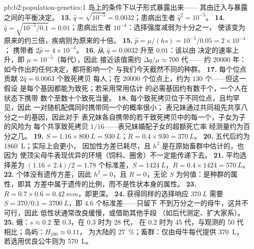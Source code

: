 \begin{solution}{pb:b2:population-genetics:1}
岛上的条件下以子形式暴露出来——
其由迁入与暴露之间的平衡决定。
\textbf{13.} $\hat q = \sqrt{10^{-5}} = 0.0032$；患病出生者 $\hat
q^{2} = 10^{-5}$。
\textbf{14.} $\hat q = \sqrt{10^{-5}/0.1} = 0.01$；患病出生者
$10^{-4}$：选择强度减弱为十分之一，
使该变为原来的约三倍，疾病则为原来的十倍。
\textbf{15.} $\hat p = \mu/(hs) = 10^{-5}/0.05 = 2\times 10^{-4}$；
携带者 $2\hat p = 4\times 10^{-4}$。
\textbf{16.} 从 $\hat q = 0.0032$ 升至 $0.01$：该以由
决定的速率上升，即 $\mu = 10^{-5}$（每代），因此
接近该值需约 $\Delta q/\mu \approx 700$ 代——
约 \num{20000} 年：如今作出的任何决定，都将影响一个
与我们今天截然不同的种群。
\textbf{17.} 每个位点贡献 $2\hat q = 0.0063$ 个致死拷贝
每人；在 \num{20000} 个位点上，约为 $130$ 个——但这一假设
是每个基因都能为致死；若采用常用估计
的必需基因约有数千个，一个人在状态下携带
数个至数十个致死当量。
\textbf{18.} 每个致死拷贝位于不同位点，且均罕见，因此
一对随机配偶同时携带同一个的概率很小；
表兄妹通过共同祖先共享八分之一的基因，因此对于
表兄妹各自携带的若干致死拷贝中的每一个，子女为子的风险为
每个共享致死拷贝 $1/16$——表兄妹婚配子女的超额死亡率
经测量约为百分之几。
\textbf{19.} $S = 1.16\times \qty{800}{L} = \qty{930}{L}$；$R = 0.4\times
930 = \qty{370}{L}$。
\textbf{20.} 五代后约为 \qty{1860}{L}；实际上会更小，
因加性方差已耗尽，且 $h^{2}$
是在原始畜群中估计的，也因为
使顶尖母牛表现优异的环境（饲料、圈舍）不一定能传递下去。
\textbf{21.} 平均选择差为 $(1.16 + 2.4)/2 = 1.78$
个标准差，$S = \qty{1424}{L}$，$R = 0.4\times 1424 = \qty{570}{L}$。
\textbf{22.} 个体没有遗传方差，因此 $h^{2} = 0$，且 $R =
0$，无论 $S$ 为何值：是种群的属性，即其
方差中属于遗传的比例，而不是性状本身的属性。
\textbf{23.} $R = 0.7\times 0.6 = \qty{0.42}{mm}$，即更深。
\textbf{24.} 获得同样的选择响应 $\qty{370}{L}$ 需要 $S = 370/0.1 =
\qty{3700}{L}$，即 $4.6$ 个标准差——只留下
不到万分之一的母牛，这并不可行，因此
低性状通常改良缓慢，或借助其他手段
（如后代测定、扩大家系）。
\textbf{25.} 蛾：$s \approx 0.2$ 至 $0.3$，在 $0.3$ 时为 28 代，
在 $0.2$ 时为 45 代，与观测的 50 代相比；岛屿：$H_{100} \approx 0.11$，
为大陆的 \qty{27}{\%}；畜群：仅由母牛每代提供 \qty{370}{L}，
若选用优良公牛则为 \qty{570}{L}。
\end{solution}
